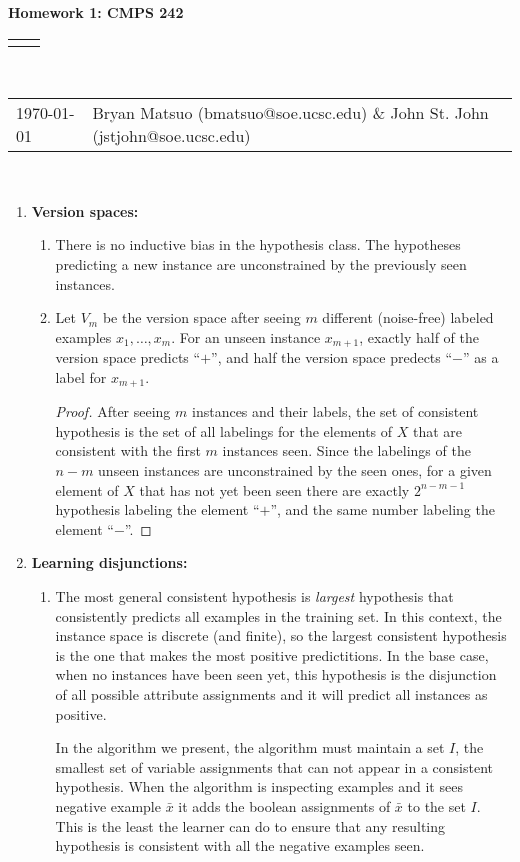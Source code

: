 \documentclass[12pt]{article}
\renewcommand{\title}[1]{\textbf{#1}\\}
\renewcommand{\line}{\begin{tabularx}{\textwidth}{X>{\raggedleft}X}\hline\\\end{tabularx}\\[-0.5cm]}
\newcommand{\leftright}[2]{\begin{tabularx}{\textwidth}{X>{\raggedleft}X}#1%
& #2\\\end{tabularx}\\[-0.5cm]}
\begin{document}
\title{Homework 1: CMPS 242}
\line
\leftright{\today}{Bryan Matsuo (bmatsuo@soe.ucsc.edu) \& John St. John (jstjohn@soe.ucsc.edu)} %
\begin{enumerate}
\item \textbf{Version spaces: }

\begin{enumerate}
\item There is no inductive bias in the hypothesis class. The hypotheses predicting a new instance are unconstrained by the previously seen instances.
\item 
Let $V_m$ be the version space after seeing $m$ different (noise-free) labeled examples $x_1, \dots, x_m$. For an unseen instance $x_{m+1}$, exactly half of the version space predicts ``$+$'', and half the version space predects ``$-$'' as a label for $x_{m+1}$.

\begin{proof}
    After seeing $m$ instances and their labels, the set of consistent hypothesis is the set of all labelings for the elements of $X$ that are consistent with the first $m$ instances seen. Since the labelings of the $n-m$ unseen instances are unconstrained by the seen ones, for a given element of $X$ that has not yet been seen there are exactly $2^{n-m-1}$ hypothesis labeling the element ``$+$'', and the same number labeling the element ``$-$''.
\end{proof}

\end{enumerate}
\item \textbf{ Learning disjunctions: }

\begin{enumerate}
\item The most general consistent hypothesis is \emph{largest} hypothesis
that consistently predicts all examples in the training set.
In this context, the instance space is discrete (and finite),
so the largest consistent hypothesis is the one that makes the most
positive predictitions.
In the base case, when no instances have been seen yet, this hypothesis is
the disjunction of all possible attribute assignments and it will predict
all instances as positive.

In the algorithm we present, the algorithm must maintain a set $I$, the smallest
set of variable assignments that can not appear in a consistent hypothesis.
When the algorithm is inspecting examples and it sees negative example $\bar{x}$ 
it adds the boolean assignments of $\bar{x}$ to the set $I$.
This is the least the learner can do to ensure that any resulting hypothesis
is consistent with all the negative examples seen.


\end{enumerate}
\end{enumerate}
\end{document}
